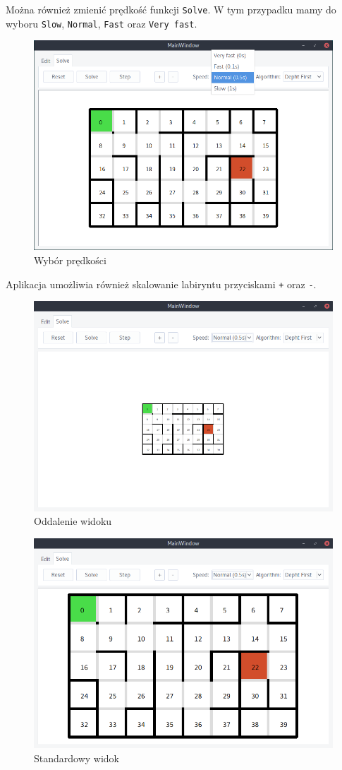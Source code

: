 \documentclass[12pt,a4paper]{article}
\begin{document}
	
	Można również zmienić prędkość funkcji \texttt{Solve}. W tym
	przypadku mamy do wyboru \texttt{Slow}, \texttt{Normal},
	\texttt{Fast} oraz \texttt{Very fast}.
	\begin{figure}[H]
		\centering
		\includegraphics[width=0.8\linewidth]{obrazki/10_new.png}
		\caption{Wybór prędkości}
	\end{figure}
	
	
	Aplikacja umożliwia również skalowanie labiryntu przyciskami
	\texttt{{+}} oraz \texttt{{-}}.
	\begin{figure}[H]
		\centering
		\includegraphics[width=0.8\linewidth]{obrazki/11.png}
		\caption{Oddalenie widoku}
	\end{figure}
	
	\begin{figure}[H]
		\centering
		\includegraphics[width=0.8\linewidth]{obrazki/12.png}
		\caption{Standardowy widok}
	\end{figure}
	
\end{document}
